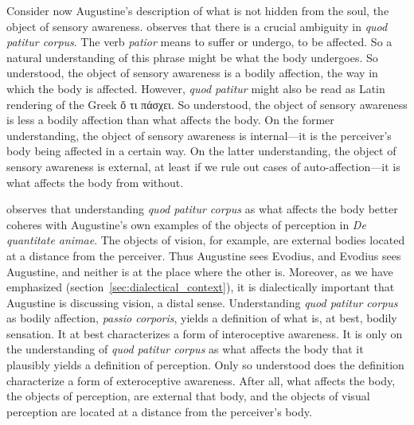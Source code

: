 \documentclass[12pt]{article}
\begin{document}
Consider now Augustine's description of what is not hidden from the soul, the object of sensory awareness. \citet[274--278]{Brittain:2002hl} observes that there is a crucial ambiguity in \emph{quod patitur corpus}. The verb \emph{patior} means to suffer or undergo, to be affected. So a natural understanding of this phrase might be what the body undergoes. So understood, the object of sensory awareness is a bodily affection, the way in which the body is affected. However, \emph{quod patitur} might also be read as Latin rendering of the Greek {\sbl ὅ τι πάσχει}. So understood, the object of sensory awareness is less a bodily affection than what affects the body. On the former understanding, the object of sensory awareness is internal---it is the perceiver's body being affected in a certain way. On the latter understanding, the object of sensory awareness is external, at least if we rule out cases of auto-affection---it is what affects the body from without. 

\citet[]{Brittain:2002hl} observes that understanding \emph{quod patitur corpus} as what affects the body better coheres with Augustine's own examples of the objects of perception in \emph{De quantitate animae}. The objects of vision, for example, are external bodies located at a distance from the perceiver. Thus Augustine sees Evodius, and Evodius sees Augustine, and neither is at the place where the other is. Moreover, as we have emphasized (section~\ref{sec:dialectical_context}), it is dialectically important that Augustine is discussing vision, a distal sense.
Understanding \emph{quod patitur corpus} as bodily affection, \emph{passio corporis}, yields a definition of what is, at best, bodily sensation. It at best characterizes a form of interoceptive awareness. It is only on the understanding of \emph{quod patitur corpus} as what affects the body that it plausibly yields a definition of perception. Only so understood does the definition characterize a form of exteroceptive awareness. After all, what affects the body, the objects of perception, are external that body, and the objects of visual perception are located at a distance from the perceiver's body.

\end{document}
